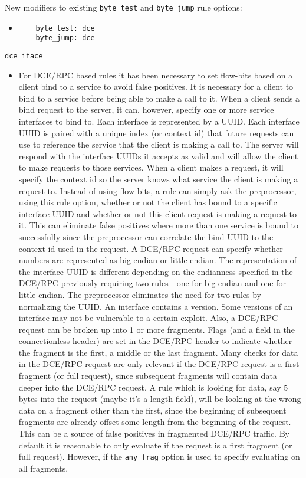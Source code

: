 \documentclass[english]{report}
\begin{document}
New modifiers to existing \texttt{byte\_test} and \texttt{byte\_jump} rule
options:

\begin{itemize}
\item[]
\begin{verbatim}
    byte_test: dce
    byte_jump: dce
\end{verbatim}
\end{itemize}

\texttt{dce\_iface}
\label{dcerpc2:dce_iface}
\begin{itemize}

\item[] For DCE/RPC based rules it has been necessary to set flow-bits based on
a client bind to a service to avoid false positives.  It is necessary for a
client to bind to a service before being able to make a call to it. When a
client sends a bind request to the server, it can, however, specify one or more
service interfaces to bind to. Each interface is represented by a UUID. Each
interface UUID is paired with a unique index (or context id) that future
requests can use to reference the service that the client is making a call to.
The server will respond with the interface UUIDs it accepts as valid and will
allow the client to make requests to those services.  When a client makes a
request, it will specify the context id so the server knows what service the
client is making a request to. Instead of using flow-bits, a rule can simply
ask the preprocessor, using this rule option, whether or not the client has
bound to a specific interface UUID and whether or not this client request is
making a request to it. This can eliminate false positives where more than one
service is bound to successfully since the preprocessor can correlate the bind
UUID to the context id used in the request.  A DCE/RPC request can specify
whether numbers are represented as big endian or little endian. The
representation of the interface UUID is different depending on the endianness
specified in the DCE/RPC previously requiring two rules - one for big endian
and one for little endian.  The preprocessor eliminates the need for two rules
by normalizing the UUID.  An interface contains a version. Some versions of an
interface may not be vulnerable to a certain exploit.  Also, a DCE/RPC request
can be broken up into 1 or more fragments. Flags (and a field in the
connectionless header) are set in the DCE/RPC header to indicate whether the
fragment is the first, a middle or the last fragment. Many checks for data in
the DCE/RPC request are only relevant if the DCE/RPC request is a first
fragment (or full request), since subsequent fragments will contain data deeper
into the DCE/RPC request. A rule which is looking for data, say 5 bytes into
the request (maybe it's a length field), will be looking at the wrong data on a
fragment other than the first, since the beginning of subsequent fragments are
already offset some length from the beginning of the request. This can be a
source of false positives in fragmented DCE/RPC traffic. By default it is
reasonable to only evaluate if the request is a first fragment (or full
request).  However, if the \texttt{any\_frag} option is used to specify
evaluating on all fragments.\\


\end{itemize}
\end{document}
